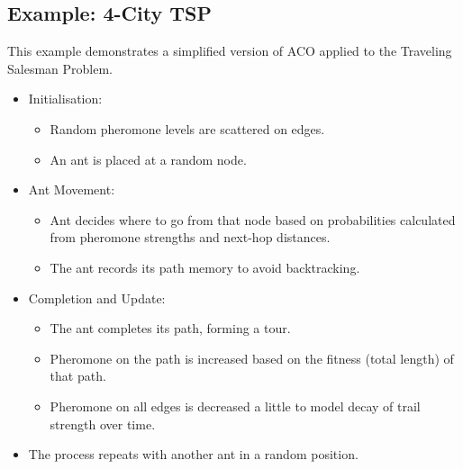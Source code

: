 \subsection*{Example: 4-City TSP}
This example demonstrates a simplified version of ACO applied to the Traveling Salesman Problem.
\begin{itemize}
    \item Initialisation:
        \begin{itemize}
            \item Random pheromone levels are scattered on edges.
            \item An ant is placed at a random node.
        \end{itemize}
    \item  Ant Movement:
        \begin{itemize}
            \item  Ant decides where to go from that node based on probabilities calculated from pheromone strengths and next-hop distances.
            \item The ant records its path memory to avoid backtracking.
        \end{itemize}
\item Completion and Update:
        \begin{itemize}
            \item  The ant completes its path, forming a tour.
            \item Pheromone on the path is increased based on the fitness (total length) of that path.
             \item Pheromone on all edges is decreased a little to model decay of trail strength over time.
        \end{itemize}
    \item The process repeats with another ant in a random position.
\end{itemize}
